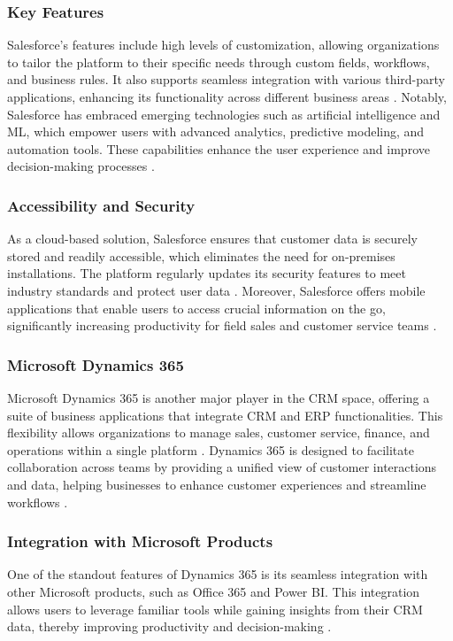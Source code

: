 \subsubsection{Key Features}
Salesforce's features include high levels of customization, allowing organizations to tailor the platform to their specific needs through custom fields, workflows, and business rules. It also supports seamless integration with various third-party applications, enhancing its functionality across different business areas \cite{vtiger_crm,vofox}. Notably, Salesforce has embraced emerging technologies such as artificial intelligence and ML, which empower users with advanced analytics, predictive modeling, and automation tools. These capabilities enhance the user experience and improve decision-making processes \cite{quota,medium}.

\subsubsection{Accessibility and Security}
As a cloud-based solution, Salesforce ensures that customer data is securely stored and readily accessible, which eliminates the need for on-premises installations. The platform regularly updates its security features to meet industry standards and protect user data \cite{vofox}. Moreover, Salesforce offers mobile applications that enable users to access crucial information on the go, significantly increasing productivity for field sales and customer service teams \cite{dulcika}.

\subsubsection{Microsoft Dynamics 365}
Microsoft Dynamics 365 is another major player in the CRM space, offering a suite of business applications that integrate CRM and ERP functionalities. This flexibility allows organizations to manage sales, customer service, finance, and operations within a single platform \cite{forbes_crm}. Dynamics 365 is designed to facilitate collaboration across teams by providing a unified view of customer interactions and data, helping businesses to enhance customer experiences and streamline workflows \cite{vtiger_crm}.

\subsubsection{Integration with Microsoft Products}
One of the standout features of Dynamics 365 is its seamless integration with other Microsoft products, such as Office 365 and Power BI. This integration allows users to leverage familiar tools while gaining insights from their CRM data, thereby improving productivity and decision-making \cite{forbes_crm,vofox}.


